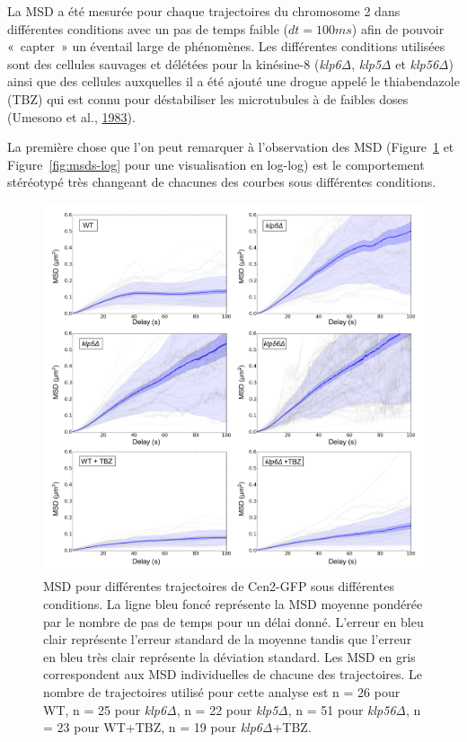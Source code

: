 \documentclass[12pt,a4paper,twoside,openright]{book}
\begin{document}
La MSD a été mesurée pour chaque trajectoires du chromosome 2 dans
différentes conditions avec un pas de temps faible (\(dt=100ms\)) afin
de pouvoir «~capter~» un éventail large de phénomènes. Les différentes
conditions utilisées sont des cellules sauvages et délétées pour la
kinésine-8 (\emph{klp6Δ}, \emph{klp5Δ} et \emph{klp56Δ}) ainsi que des
cellules auxquelles il a été ajouté une drogue appelé le thiabendazole
(TBZ) qui est connu pour déstabiliser les microtubules à de faibles
doses (Umesono et al., \protect\hyperlink{ref-Umesono1983}{1983}).

La première chose que l'on peut remarquer à l'observation des MSD
(Figure~\ref{fig:msds} et Figure~\ref{fig:msds-log} pour une
visualisation en log-log) est le comportement stéréotypé très changeant
de chacunes des courbes sous différentes conditions.

\begin{figure}[htbp]
\centering
\includegraphics{figures/results/imaging/msds.png}
\caption[MSD pour différentes trajectoires de Cen2-GFP sous différentes conditions.]{\label{fig:msds}MSD
pour différentes trajectoires de Cen2-GFP sous différentes conditions.
La ligne bleu foncé représente la MSD moyenne pondérée par le nombre de
pas de temps pour un délai donné. L'erreur en bleu clair représente
l'erreur standard de la moyenne tandis que l'erreur en bleu très clair
représente la déviation standard. Les MSD en gris correspondent aux MSD
individuelles de chacune des trajectoires. Le nombre de trajectoires
utilisé pour cette analyse est n = 26 pour WT, n = 25 pour \emph{klp6Δ},
n = 22 pour \emph{klp5Δ}, n = 51 pour \emph{klp56Δ}, n = 23 pour WT+TBZ,
n = 19 pour \emph{klp6Δ}+TBZ.}
\end{figure}
\end{document}
